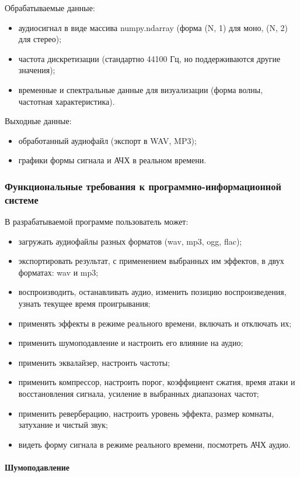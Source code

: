 Обрабатываемые данные:
\begin{itemize}
	\item аудиосигнал в виде массива numpy.ndarray (форма (N, 1) для моно, (N, 2) для стерео); 
	\item частота дискретизации (стандартно 44100 Гц, но поддерживаются другие значения);
	\item временные и спектральные данные для визуализации (форма волны, частотная характеристика).
\end{itemize}

Выходные данные:
\begin{itemize}
	\item обработанный аудиофайл (экспорт в WAV, MP3);
	\item графики формы сигнала и АЧХ в реальном времени.
\end{itemize}

\subsubsection{Функциональные требования к программно-информационной системе}

В разрабатываемой программе пользователь может:
\begin{itemize}
	\item загружать аудиофайлы разных форматов (wav, mp3, ogg, flac);
	\item экспортировать результат, с применением выбранных им эффектов, в двух форматах: wav и mp3;
	\item воспроизводить, останавливать аудио, изменить позицию воспроизведения, узнать текущее время проигрывания;
	\item применять эффекты в режиме реального времени, включать и отключать их;
	\item применить шумоподавление и настроить его влияние на аудио;
	\item применить эквалайзер, настроить частоты;
	\item применить компрессор, настроить порог, коэффициент сжатия, время атаки и восстановления сигнала, усиление в выбранных диапазонах частот;
	\item применить реверберацию, настроить уровень эффекта, размер комнаты, затухание и чистый звук;
	\item видеть форму сигнала в режиме реального времени, посмотреть АЧХ аудио.
\end{itemize}

\paragraph{Шумоподавление}

